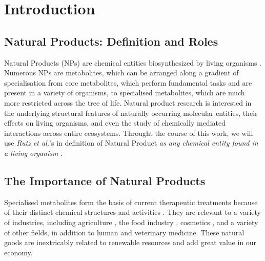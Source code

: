 \documentclass[
11pt, %
oneside, %
english, %
singlespacing, %
headsepline, %
chapterinoneline, %
]{MastersDoctoralThesis} %
\begin{document}



\mainmatter %

\pagestyle{thesis} %


%
% 
%
% 
% 
%

\chapter{Introduction}\label{chap:intro}

\section{Natural Products: Definition and Roles}\label{sec:NP def and roles}
Natural Products (NPs) are chemical entities biosynthesized by living organisms \cite{AllNatural2007}. Numerous NPs are metabolites, which can be arranged along a gradient of specialisation from core metabolites, which perform fundamental tasks and are present in a variety of organisms, to specialised metabolites, which are much more restricted across the tree of life. Natural product research is interested in the underlying structural features of naturally occurring molecular entities, their effects on living organisms, and even the study of chemically mediated interactions across entire ecosystems. Throught the course of this work, we will use \textit{Rutz et al.}'s in definition of Natural Product \textit{as any chemical entity found in a living organism} \cite{rutzLOTUSInitiativeOpen2022}.

\section{The Importance of Natural Products}
Specialised metabolites form the basis of current therapeutic treatments because of their distinct chemical structures and activities \cite{harveyReemergenceNaturalProducts2015}. They are relevant to a variety of industries, including agriculture \cite{yanImpactProspectNatural2018}, the food industry \cite{gonzalez-manzanoApplicationsNaturalProducts2021}, cosmetics \cite{liuNaturalProductsCosmetics2022}, and a variety of other fields, in addition to human and veterinary medicine. These natural goods are inextricably related to renewable resources and add great value in our economy.
\end{document}
